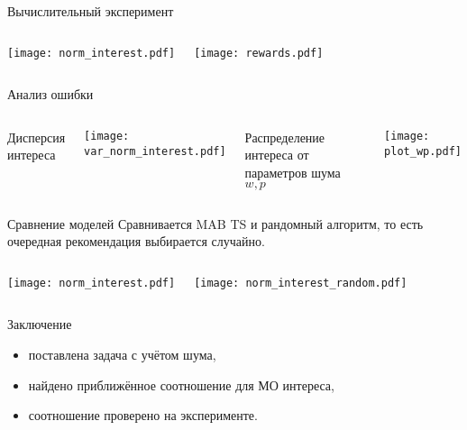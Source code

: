 \documentclass{beamer}
\begin{document}
\begin{frame}{Вычислительный эксперимент}
\begin{columns}[c]
\begin{center}
  \texttt{[image: norm\_interest.pdf]}
\end{center}
\begin{center}
  \texttt{[image: rewards.pdf]}
\end{center}
\end{columns}

\end{frame}
\begin{frame}{Анализ ошибки}

\begin{columns}[c]
Дисперсия интереса
\begin{center}
  \texttt{[image: var\_norm\_interest.pdf]}
\end{center}
Распределение интереса от параметров шума $w, p$
\begin{center}
  \texttt{[image: plot\_wp.pdf]}
\end{center}
\end{columns}

\end{frame}
\begin{frame}{Сравнение моделей}
Сравнивается MAB TS и рандомный алгоритм, то есть очередная рекомендация выбирается случайно.
\begin{columns}[c]
\begin{center}
  \texttt{[image: norm\_interest.pdf]}
\end{center}
\begin{center}
  \texttt{[image: norm\_interest\_random.pdf]}
\end{center}
\end{columns}
\end{frame}
\begin{frame}{Заключение}
  \begin{itemize}
      \item поставлена задача с учётом шума,
      \item найдено приближённое соотношение для МО интереса,
      \item соотношение проверено на эксперименте.
  \end{itemize}
\end{frame}
\end{document}

